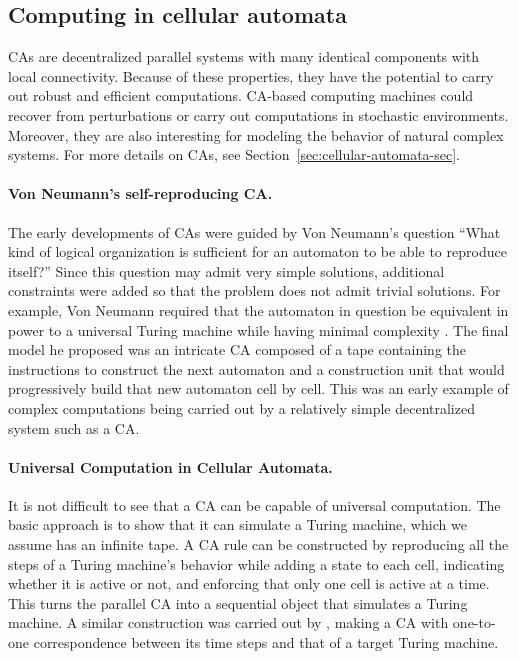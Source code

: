 \subsection{Computing in cellular automata}\label{sec:comp-cell-autom}

\Acfp{CA} are decentralized parallel systems with many identical components with
local connectivity. Because of these properties, they have the potential to
carry out robust and efficient computations. \ac{CA}-based computing machines could
recover from perturbations or carry out computations in stochastic environments.
Moreover, they are also interesting for modeling the behavior of natural complex
systems. For more details on \acp{CA}, see Section~\ref{sec:cellular-automata-sec}.

\paragraph{Von Neumann's self-reproducing \ac{CA}.}
The early developments of \acp{CA} were guided by Von Neumann's question ``What
kind of logical organization is sufficient for an automaton to be able to
reproduce itself?'' Since this question may admit very simple solutions,
additional constraints were added so that the problem does not admit trivial
solutions. For example, Von Neumann required that the automaton in question be
equivalent in power to a universal Turing machine while having minimal
complexity \parencite{vonneumannTheorySelfreproducingAutomata1966}. The final
model he proposed was an intricate \ac{CA} composed of a tape containing the
instructions to construct the next automaton and a construction unit that
would progressively build that new automaton cell by cell. This was an early
example of complex computations being carried out by a relatively simple
decentralized system such as a \ac{CA}.

\paragraph{Universal Computation in Cellular Automata.}
It is not difficult to see that a \ac{CA} can be capable of universal
computation. The basic approach is to show that it can simulate a Turing
machine, which we assume has an infinite tape. A \ac{CA} rule can be constructed
by reproducing all the steps of a Turing machine's behavior while adding a state
to each cell, indicating whether it is active or not, and enforcing that only one
cell is active at a time. This turns the parallel \ac{CA} into a sequential
object that simulates a Turing machine. A similar construction was carried out
by \parencite{smithSimpleComputationUniversalCellular1971}, making a \ac{CA}
with one-to-one correspondence between its time steps and that of a target
Turing machine.

